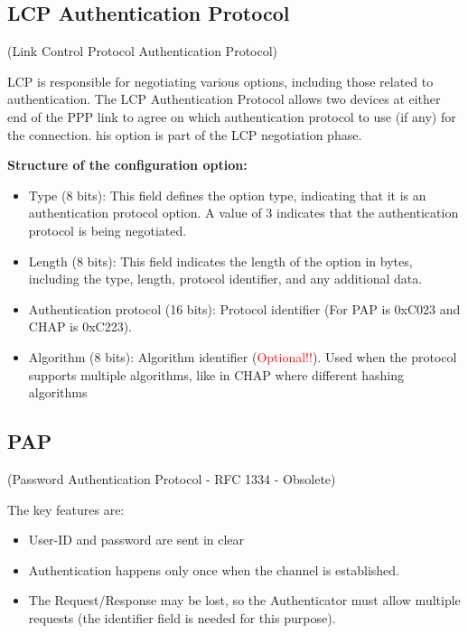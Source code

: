 \subsection{LCP Authentication Protocol}
\begin{center}
    (Link Control Protocol Authentication Protocol)
\end{center}
LCP is responsible for negotiating various options, including those related to authentication. The LCP Authentication Protocol allows two devices at either end of the PPP link to agree on which authentication protocol to use (if any) for the connection. his option is part of the LCP negotiation phase. \newline 

\textbf{Structure of the configuration option:}
\begin{itemize}
    \item Type (8 bits): This field defines the option type, indicating that it is an authentication protocol option. A value of 3 indicates that the authentication protocol is being negotiated.
    \item Length (8 bits): This field indicates the length of the option in bytes, including the type, length, protocol identifier, and any additional data.
    \item Authentication protocol (16 bits): Protocol identifier (For PAP is 0xC023 and CHAP is 0xC223).
    \item Algorithm (8 bits): Algorithm identifier (\textcolor{red}{Optional!!}). Used when the protocol supports multiple algorithms, like in CHAP where different hashing algorithms
\end{itemize}

\subsection{PAP}
\begin{center}
    (Password Authentication Protocol - RFC 1334 - Obsolete)
\end{center}
The key features are: 
\begin{itemize}
    \item User-ID and password are sent in clear
    \item Authentication happens only once when the channel is established.
    \item The Request/Response may be lost, so the Authenticator must allow multiple requests (the identifier field is needed for this purpose).
\end{itemize}

